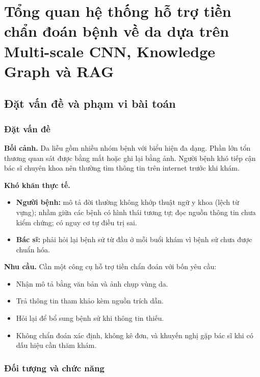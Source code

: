 \chapter[\MakeUppercase{Tổng quan hệ thống hỗ trợ tiền chẩn đoán bệnh về da dựa trên Multi-scale CNN, Knowledge Graph và RAG}]{Tổng quan hệ thống hỗ trợ tiền chẩn đoán bệnh về da dựa trên Multi-scale CNN, Knowledge Graph và RAG}
\label{ch:chuong1}

\section{Đặt vấn đề và phạm vi bài toán}

\subsection{Đặt vấn đề}

\textbf{Bối cảnh.} Da liễu gồm nhiều nhóm bệnh với biểu hiện đa dạng. Phần lớn tổn thương quan sát được bằng mắt hoặc ghi lại bằng ảnh. Người bệnh khó tiếp cận bác sĩ chuyên khoa nên thường tìm thông tin trên internet trước khi khám.

\textbf{Khó khăn thực tế.}
\begin{itemize}
  \item \textbf{Người bệnh:} mô tả đời thường không khớp thuật ngữ y khoa (lệch từ vựng); nhầm giữa các bệnh có hình thái tương tự; đọc nguồn thông tin chưa kiểm chứng; có nguy cơ tự điều trị sai.
  \item \textbf{Bác sĩ:} phải hỏi lại bệnh sử từ đầu ở mỗi buổi khám vì bệnh sử chưa được chuẩn hóa.
\end{itemize}

\textbf{Nhu cầu.} Cần một công cụ hỗ trợ tiền chẩn đoán với bốn yêu cầu:
\begin{itemize}
  \item Nhận mô tả bằng văn bản và ảnh chụp vùng da.
  \item Trả thông tin tham khảo kèm nguồn trích dẫn.
  \item Hỏi lại để bổ sung bệnh sử khi thông tin thiếu.
  \item Không chẩn đoán xác định, không kê đơn, và khuyến nghị gặp bác sĩ khi có dấu hiệu cần thăm khám.
\end{itemize}

\subsection{Đối tượng và chức năng}

